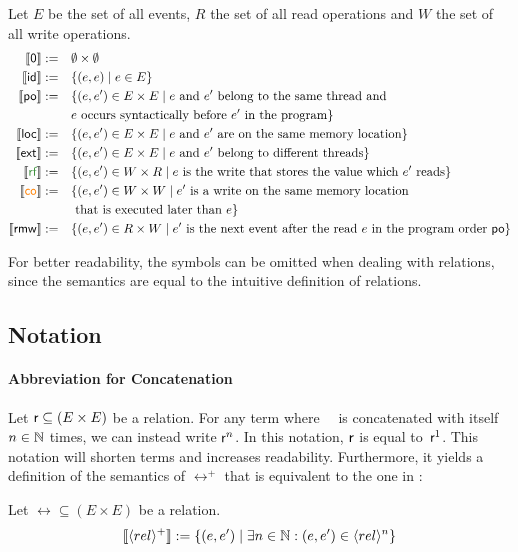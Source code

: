 \documentclass[a4paper,twoside,12pt, english]{article}
\begin{document}
\begin{definition}\label{def:baserelations}
Let $E$ be the set of all events, $R$ the set of all read operations and $W$ the set of all write operations. \small
\begin{align*}
\semsof{\0} := \quad & \emptyset \times \emptyset \\
\semsof{\id} := \quad & \{(e,e) \mid e \in E\} \\
\semsof{\po} := \quad & \{\edgein E\times E \mid e \text{ and } e' \text{ belong to the same thread and }\\
& e \text{ occurs syntactically before } e' \text{ in the program}\} \\
\semsof{\loc} := \quad & \{\edgein E\times E \mid e \text{ and } e' \text{ are on the same memory location}\} \\
\semsof{\ext} := \quad & \{\edgein E\times E \mid e \text{ and } e' \text{ belong to different threads}\} \\
\semsof{\rf} := \quad & \{\edgein W \times R \mid e \text{ is the write that stores the value which } e' \text{ reads} \} \\
\semsof{\co} := \quad & \{\edgein W\times W \mid e' \text{ is a write on the same memory location} \\ & \text{ that is executed later than } e\} \\
\semsof{\rmw} := \quad & \{\edgein R \times W \mid e' \text{ is the next event after the read } e \text{ in the program order } \po\}
\end{align*}
\end{definition}
For better readability, the \semsof{\cdot} symbols can be omitted when dealing with relations, since the semantics are equal to the intuitive definition of relations.


\subsection{Notation}\label{sec:notation}
\paragraph{Abbreviation for Concatenation}
Let $\textsf{\upshape r} \subseteq (E \times E)$ be a relation. For any term where~\relr~ is concatenated with itself~$n \in \mathbb{N}$ times, we can instead write $\textsf{\upshape r}^n$. In this notation, $\textsf{\upshape r}$ is equal to~$\textsf{\upshape r}^1$. This notation will shorten terms and increases readability. Furthermore, it yields a definition of the semantics of $\rel^+$ that is equivalent to the one in :
\begin{definition} \label{def:alttc}
Let $\rel \subseteq (E\times E)$ be a relation.
\[\llbracket \langle rel \rangle^+ \rrbracket := \{(e,e') \mid \exists n \in \mathbb{N}: (e,e') \in  \langle rel \rangle^n\}\] \end{definition}
\end{document}
